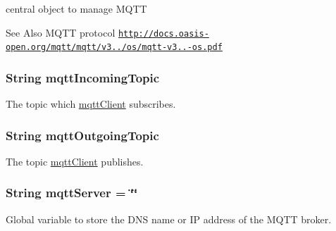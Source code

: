 central object to manage M\-Q\-T\-T 

\begin{DoxySeeAlso}{See Also}
M\-Q\-T\-T protocol \href{http://docs.oasis-open.org/mqtt/mqtt/v3.1.1/os/mqtt-v3.1.1-os.pdf}{\tt http\-://docs.\-oasis-\/open.\-org/mqtt/mqtt/v3../os/mqtt-\/v3..-\/os.\-pdf} 
\end{DoxySeeAlso}
\hypertarget{WIFIOnOff_8ino_a686cf2365a7075bc5f72d01c99b3a9f2}{
\subsubsection[{mqtt\-Incoming\-Topic}]{\setlength{\rightskip}{0pt plus 5cm}String mqtt\-Incoming\-Topic}}\label{WIFIOnOff_8ino_a686cf2365a7075bc5f72d01c99b3a9f2}


The topic which \hyperlink{WIFIOnOff_8ino_a0524591f2a058a4f26f16579245db356}{mqtt\-Client} subscribes. 

\hypertarget{WIFIOnOff_8ino_a2311f2b74fe46d3f9e8072b3694deee5}{
\subsubsection[{mqtt\-Outgoing\-Topic}]{\setlength{\rightskip}{0pt plus 5cm}String mqtt\-Outgoing\-Topic}}\label{WIFIOnOff_8ino_a2311f2b74fe46d3f9e8072b3694deee5}


The topic \hyperlink{WIFIOnOff_8ino_a0524591f2a058a4f26f16579245db356}{mqtt\-Client} publishes. 

\hypertarget{WIFIOnOff_8ino_a020889fcca6224d14f4d3f4241ca4467}{
\subsubsection[{mqtt\-Server}]{\setlength{\rightskip}{0pt plus 5cm}String mqtt\-Server = \char`\"{}\char`\"{}}}\label{WIFIOnOff_8ino_a020889fcca6224d14f4d3f4241ca4467}


Global variable to store the D\-N\-S name or I\-P address of the M\-Q\-T\-T broker. 


